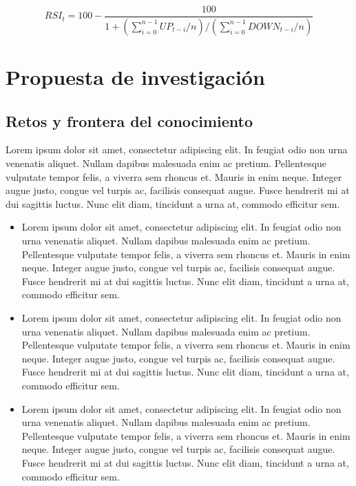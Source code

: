 \documentclass[letterpaper,twoside,10pt]{report}
\begin{document}
\begin{equation}
RSI_t = 100- \frac{100}{1+(\sum_{i=0}^{n-1}{UP_{t-i}/n})/(\sum_{i=0}^{n-1}{DOWN_{t-i}/n})}
\end{equation} 

\chapter{Propuesta de investigación}\label{propuesta}

\section{Retos y frontera del conocimiento}

Lorem ipsum dolor sit amet, consectetur adipiscing elit. In feugiat odio non urna venenatis aliquet. Nullam dapibus malesuada enim ac pretium. Pellentesque vulputate tempor felis, a viverra sem rhoncus et. Mauris in enim neque. Integer augue justo, congue vel turpis ac, facilisis consequat augue. Fusce hendrerit mi at dui sagittis luctus. Nunc elit diam, tincidunt a urna at, commodo efficitur sem.

\begin{itemize}
	\item Lorem ipsum dolor sit amet, consectetur adipiscing elit. In feugiat odio non urna venenatis aliquet. Nullam dapibus malesuada enim ac pretium. Pellentesque vulputate tempor felis, a viverra sem rhoncus et. Mauris in enim neque. Integer augue justo, congue vel turpis ac, facilisis consequat augue. Fusce hendrerit mi at dui sagittis luctus. Nunc elit diam, tincidunt a urna at, commodo efficitur sem.
	
	\item Lorem ipsum dolor sit amet, consectetur adipiscing elit. In feugiat odio non urna venenatis aliquet. Nullam dapibus malesuada enim ac pretium. Pellentesque vulputate tempor felis, a viverra sem rhoncus et. Mauris in enim neque. Integer augue justo, congue vel turpis ac, facilisis consequat augue. Fusce hendrerit mi at dui sagittis luctus. Nunc elit diam, tincidunt a urna at, commodo efficitur sem.
	
	\item Lorem ipsum dolor sit amet, consectetur adipiscing elit. In feugiat odio non urna venenatis aliquet. Nullam dapibus malesuada enim ac pretium. Pellentesque vulputate tempor felis, a viverra sem rhoncus et. Mauris in enim neque. Integer augue justo, congue vel turpis ac, facilisis consequat augue. Fusce hendrerit mi at dui sagittis luctus. Nunc elit diam, tincidunt a urna at, commodo efficitur sem.
	
\end{itemize}
\end{document}
